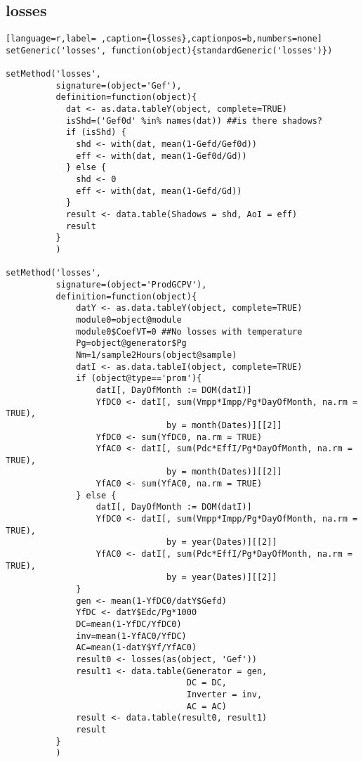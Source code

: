 \subsection{losses}
\label{sec:org66b0693}
\label{subsec:losses}
\begin{lstlisting}[language=r,label= ,caption={losses},captionpos=b,numbers=none]
setGeneric('losses', function(object){standardGeneric('losses')})

setMethod('losses',
          signature=(object='Gef'),
          definition=function(object){
            dat <- as.data.tableY(object, complete=TRUE)
            isShd=('Gef0d' %in% names(dat)) ##is there shadows?
            if (isShd) {
              shd <- with(dat, mean(1-Gefd/Gef0d))
              eff <- with(dat, mean(1-Gef0d/Gd))
            } else {
              shd <- 0
              eff <- with(dat, mean(1-Gefd/Gd))
            }
            result <- data.table(Shadows = shd, AoI = eff)
            result
          }
          )

setMethod('losses',
          signature=(object='ProdGCPV'),
          definition=function(object){
              datY <- as.data.tableY(object, complete=TRUE)
              module0=object@module
              module0$CoefVT=0 ##No losses with temperature
              Pg=object@generator$Pg
              Nm=1/sample2Hours(object@sample)
              datI <- as.data.tableI(object, complete=TRUE)
              if (object@type=='prom'){
                  datI[, DayOfMonth := DOM(datI)]
                  YfDC0 <- datI[, sum(Vmpp*Impp/Pg*DayOfMonth, na.rm = TRUE),
                                by = month(Dates)][[2]]
                  YfDC0 <- sum(YfDC0, na.rm = TRUE)
                  YfAC0 <- datI[, sum(Pdc*EffI/Pg*DayOfMonth, na.rm = TRUE),
                                by = month(Dates)][[2]]
                  YfAC0 <- sum(YfAC0, na.rm = TRUE)
              } else {
                  datI[, DayOfMonth := DOM(datI)]
                  YfDC0 <- datI[, sum(Vmpp*Impp/Pg*DayOfMonth, na.rm = TRUE),
                                by = year(Dates)][[2]]
                  YfAC0 <- datI[, sum(Pdc*EffI/Pg*DayOfMonth, na.rm = TRUE),
                                by = year(Dates)][[2]]     
              }
              gen <- mean(1-YfDC0/datY$Gefd)
              YfDC <- datY$Edc/Pg*1000
              DC=mean(1-YfDC/YfDC0)
              inv=mean(1-YfAC0/YfDC)
              AC=mean(1-datY$Yf/YfAC0)
              result0 <- losses(as(object, 'Gef'))
              result1 <- data.table(Generator = gen,
                                    DC = DC,
                                    Inverter = inv,
                                    AC = AC)
              result <- data.table(result0, result1)
              result
          }
          )


\end{lstlisting}

